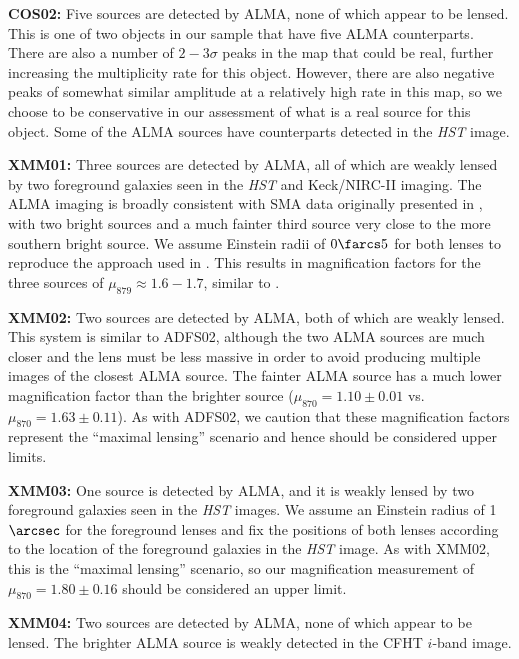 \documentclass[iop]{emulateapj}
\begin{document}
{\bf COS02:} Five sources are detected by ALMA, none of which appear to be
lensed.  This is one of two objects in our sample that have five ALMA
counterparts.  There are also a number of $2-3\sigma$ peaks in the map that
could be real, further increasing the multiplicity rate for this object.
However, there are also negative peaks of somewhat similar amplitude at a
relatively high rate in this map, so we choose to be conservative in our
assessment of what is a real source for this object.  Some of the ALMA sources
have counterparts detected in the {\it HST} image.

{\bf XMM01:} Three sources are detected by ALMA, all of which are weakly lensed
by two foreground galaxies seen in the {\it HST} and Keck/NIRC-II imaging.  The
ALMA imaging is broadly consistent with SMA data originally presented in
\citet{Fu:2013lr}, with two bright sources and a much fainter third source very
close to the more southern bright source.  We assume Einstein radii of
$0\farcs5$ for both lenses to reproduce the approach used in \citet{Fu:2013lr}.
This results in magnification factors for the three sources of $\mu_{879}
\approx 1.6 - 1.7$, similar to \citet{Fu:2013lr}.

{\bf XMM02:} Two sources are detected by ALMA, both of which are weakly lensed.
This system is similar to ADFS02, although the two ALMA sources are much closer
and the lens must be less massive in order to avoid producing multiple images
of the closest ALMA source.  The fainter ALMA source has a much lower
magnification factor than the brighter source ($\mu_{870} = 1.10 \pm 0.01$ vs.
$\mu_{870} = 1.63 \pm 0.11$).  As with ADFS02, we caution that these
magnification factors represent the ``maximal lensing'' scenario and hence
should be considered upper limits.

{\bf XMM03:} One source is detected by ALMA, and it is weakly lensed by two
foreground galaxies seen in the {\it HST} images.  We assume an Einstein radius
of 1$\arcsec$ for the foreground lenses and fix the positions of both lenses
according to the location of the foreground galaxies in the {\it HST} image.
As with XMM02, this is the ``maximal lensing'' scenario, so our magnification
measurement of $\mu_{870} = 1.80 \pm 0.16$ should be considered an upper limit.

{\bf XMM04:} Two sources are detected by ALMA, none of which appear to be
lensed.  The brighter ALMA source is weakly detected in the CFHT $i$-band
image.  
\end{document}
